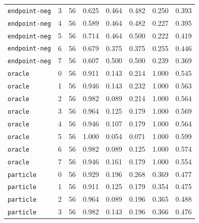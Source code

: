 \documentclass{article}
\begin{document}
\begin{center}
{\begin{tabular}{lllccccc}
\texttt{endpoint-neg} & 3 & 56 & 0.625 & 0.464 & 0.482 & 0.250 & 0.393 \\
\texttt{endpoint-neg} & 4 & 56 & 0.589 & 0.464 & 0.482 & 0.227 & 0.395 \\
\texttt{endpoint-neg} & 5 & 56 & 0.714 & 0.464 & 0.500 & 0.222 & 0.419 \\
\texttt{endpoint-neg} & 6 & 56 & 0.679 & 0.375 & 0.375 & 0.255 & 0.446 \\
\texttt{endpoint-neg} & 7 & 56 & 0.607 & 0.500 & 0.500 & 0.239 & 0.369 \\
\texttt{oracle} & 0 & 56 & 0.911 & 0.143 & 0.214 & 1.000 & 0.545 \\
\texttt{oracle} & 1 & 56 & 0.946 & 0.143 & 0.232 & 1.000 & 0.563 \\
\texttt{oracle} & 2 & 56 & 0.982 & 0.089 & 0.214 & 1.000 & 0.564 \\
\texttt{oracle} & 3 & 56 & 0.964 & 0.125 & 0.179 & 1.000 & 0.569 \\
\texttt{oracle} & 4 & 56 & 0.946 & 0.107 & 0.179 & 1.000 & 0.564 \\
\texttt{oracle} & 5 & 56 & 1.000 & 0.054 & 0.071 & 1.000 & 0.599 \\
\texttt{oracle} & 6 & 56 & 0.982 & 0.089 & 0.125 & 1.000 & 0.574 \\
\texttt{oracle} & 7 & 56 & 0.946 & 0.161 & 0.179 & 1.000 & 0.554 \\
\texttt{particle} & 0 & 56 & 0.929 & 0.196 & 0.268 & 0.369 & 0.477 \\
\texttt{particle} & 1 & 56 & 0.911 & 0.125 & 0.179 & 0.354 & 0.475 \\
\texttt{particle} & 2 & 56 & 0.964 & 0.089 & 0.196 & 0.365 & 0.488 \\
\texttt{particle} & 3 & 56 & 0.982 & 0.143 & 0.196 & 0.366 & 0.476 \\
\bottomrule
\end{tabular}%
}
\end{center}
\end{document}

